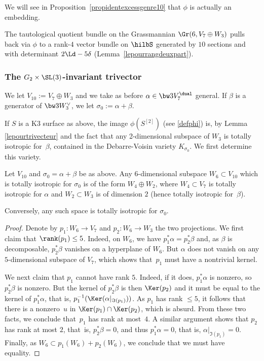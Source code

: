 {We will see in Proposition~\ref{propidentexcessgenre10} that $\phi$ is actually an embedding.}

The tautological quotient bundle on the Grassmannian $\Gr(6,V_7\oplus W_3)$ pulls back via $\phi$ to
a rank-$4$ vector bundle
on
$\hilbS$ generated by $10$ sections and with determinant
$2\Ld-5\delta$ (Lemma~\ref{lepourrangdeuxpart}).

\subsubsection{The $G_2\times \SL(3)$-invariant trivector}\label{sec422}
We let $V_{10}:=V_7\oplus W_3$ and we take as before $\alpha\in \bw3V_7^\dual $ general.
If $\beta $ is a generator of
$\bw3W_3^\vee$, we let $\sigma_0:=\alpha+\beta$.

If $S$ is a K3 surface as above, the image $\phi(S^{ [2]})$ (see \eqref{defphi}) is, by Lemma \ref{lepourtrivecteur} and the fact that any 2-dimensional subspace of $W_3$ is totally isotropic for~$\beta$, contained in the Debarre-Voisin variety $K_{\sigma_0}$. We first determine
this variety.

\begin{prop}\label{proisotsubspace}
Let $V_{10} $ and $\sigma_0=\alpha+\beta$ be as above.
Any $6$-dimensional subspace $W_6\subset V_{10} $ which is totally isotropic for $\sigma_0$ is of the form
$W_4\oplus W_2$, where $W_4\subset V_7 $ is totally isotropic for $\alpha$ and
$W_2\subset W_3$ is of dimension $2$ (hence totally isotropic for~$\beta$).

Conversely, any such space is totally isotropic for $\sigma_0$.
\end{prop}

\begin{proof} Denote by $p_1\colon W_6\to V_7 $ and $p_2\colon W_6\to W_3$ the two projections.
We first claim that $\rank (p_1)\le5$. Indeed, on $W_6$, we have
$p_1^*\alpha=p_2^*\beta$ and, as $\beta$ is decomposable, $p_2^*\beta$ vanishes on a hyperplane of $W_6$. But
$\alpha$ does not vanish on any $5$-dimensional subspace of $V_7$, which shows that~$p_1$ must have a nontrivial kernel.

We next claim that $p_1$ cannot have rank $5$. Indeed, if it does, $p_1^*\alpha$ is nonzero, so $p_2^*\beta$ is nonzero. But the kernel of $p_2^*\beta$ is then $\Ker (p_2)$ and it must be equal to the kernel of $p_1^*\alpha$, that is,
$p_1^{-1}(\Ker (\alpha\vert_{\Im (p_1)}))$. As $p_1$ has rank $\leq 5$, it follows that there is a
nonzero~$u$ in $\Ker (p_1)\cap \Ker (p_2)$, which is absurd. From these two facts, we conclude that~$p_1$ has rank at most~$4$. A similar argument shows that $p_2$ has rank
at most $2$, that~is, $p_2^*\beta=0$, and thus $p_1^*\alpha=0$, that is, $\alpha\vert_{\Im (p_1)}=0$. Finally, as $W_6\subset p_1(W_6)+p_2(W_6)$, we conclude that we must have equality.
\end{proof}

